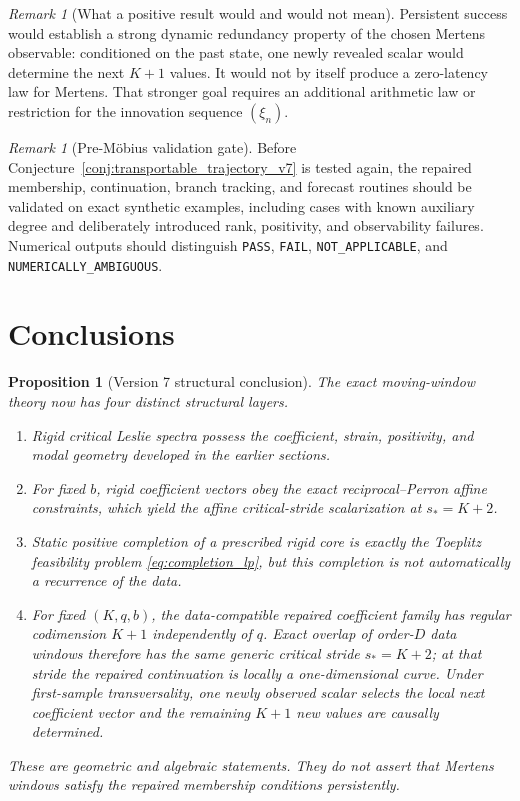 \documentclass[11pt]{amsart}
\numberwithin{equation}{section}
\theoremstyle{plain}
\newtheorem{proposition}[theorem]{Proposition}
\theoremstyle{definition}
\theoremstyle{remark}
\newtheorem{remark}[theorem]{Remark}
\begin{document}
\begin{remark}[What a positive result would and would not mean]
\label{rem:success_v7}
Persistent success would establish a strong dynamic redundancy property of the chosen Mertens observable: conditioned on the past state, one newly revealed scalar would determine the next $K+1$ values. It would not by itself produce a zero-latency law for Mertens. That stronger goal requires an additional arithmetic law or restriction for the innovation sequence $(\xi_n)$.
\end{remark}

\begin{remark}[Pre-M\"obius validation gate]
\label{rem:premobius_gate}
Before Conjecture~\ref{conj:transportable_trajectory_v7} is tested again, the repaired membership, continuation, branch tracking, and forecast routines should be validated on exact synthetic examples, including cases with known auxiliary degree and deliberately introduced rank, positivity, and observability failures. Numerical outputs should distinguish \texttt{PASS}, \texttt{FAIL}, \texttt{NOT\_APPLICABLE}, and \texttt{NUMERICALLY\_AMBIGUOUS}.
\end{remark}

\section{Conclusions}
\label{sec:conclusions}

\begin{proposition}[Version 7 structural conclusion]
\label{prop:final_conclusion_v7}
The exact moving-window theory now has four distinct structural layers.
\begin{enumerate}
\item Rigid critical Leslie spectra possess the coefficient, strain, positivity, and modal geometry developed in the earlier sections.
\item For fixed $b$, rigid coefficient vectors obey the exact reciprocal--Perron affine constraints, which yield the affine critical-stride scalarization at $s_*=K+2$.
\item Static positive completion of a prescribed rigid core is exactly the Toeplitz feasibility problem \eqref{eq:completion_lp}, but this completion is not automatically a recurrence of the data.
\item For fixed $(K,q,b)$, the data-compatible repaired coefficient family has regular codimension $K+1$ independently of $q$. Exact overlap of order-$D$ data windows therefore has the same generic critical stride $s_*=K+2$; at that stride the repaired continuation is locally a one-dimensional curve. Under first-sample transversality, one newly observed scalar selects the local next coefficient vector and the remaining $K+1$ new values are causally determined.
\end{enumerate}
These are geometric and algebraic statements. They do not assert that Mertens windows satisfy the repaired membership conditions persistently.
\end{proposition}
\end{document}
